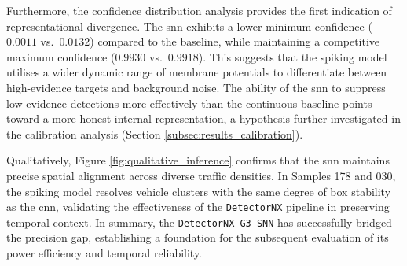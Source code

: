 Furthermore, the confidence distribution analysis provides the first indication of representational divergence. The \gls{snn} exhibits a lower minimum confidence ($0.0011$ vs.\ $0.0132$) compared to the baseline, while maintaining a competitive maximum confidence ($0.9930$ vs.\ $0.9918$). This suggests that the spiking model utilises a wider dynamic range of membrane potentials to differentiate between high-evidence targets and background noise. The ability of the \gls{snn} to suppress low-evidence detections more effectively than the continuous baseline points toward a more honest internal representation, a hypothesis further investigated in the calibration analysis (Section \ref{subsec:results_calibration}).

Qualitatively, Figure \ref{fig:qualitative_inference} confirms that the \gls{snn} maintains precise spatial alignment across diverse traffic densities. In Samples 178 and 030, the spiking model resolves vehicle clusters with the same degree of box stability as the \gls{cnn}, validating the effectiveness of the \texttt{DetectorNX} pipeline in preserving temporal context. In summary, the \texttt{DetectorNX-G3-SNN} has successfully bridged the precision gap, establishing a foundation for the subsequent evaluation of its power efficiency and temporal reliability.
